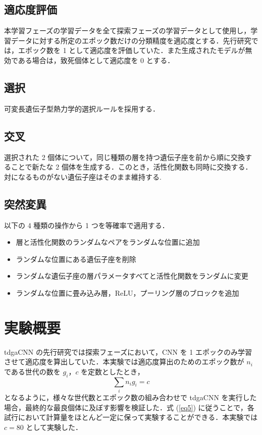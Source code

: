 \documentclass[twocolumn]{jarticle}     %
\begin{document}
\subsection{適応度評価}
本学習フェーズの学習データを全て探索フェーズの学習データとして使用し，学習データに対する所定のエポック数だけの分類精度を適応度とする．先行研究では，エポック数を 1 として適応度を評価していた．また生成されたモデルが無効である場合は，致死個体として適応度を 0 とする．

\subsection{選択}
可変長遺伝子型熱力学的選択ルールを採用する．

\subsection{交叉}
選択された 2 個体について，同じ種類の層を持つ遺伝子座を前から順に交換することで新たな 2 個体を生成する．このとき，活性化関数も同時に交換する．対になるものがない遺伝子座はそのまま維持する.

\subsection{突然変異}
以下の 4 種類の操作から 1 つを等確率で適用する．
\begin{itemize}
    \item 層と活性化関数のランダムなペアをランダムな位置に追加
    \item ランダムな位置にある遺伝子座を削除
    \item ランダムな遺伝子座の層パラメータすべてと活性化関数をランダムに変更
    \item ランダムな位置に畳み込み層，ReLU，プーリング層のブロックを追加
\end{itemize}

\section{実験概要}
tdgaCNN の先行研究では探索フェーズにおいて，CNN を 1 エポックのみ学習させて適応度を算出していた．本実験では適応度算出のためのエポック数が $n_i$ である世代の数を $g_i$，$c$ を定数としたとき，
\begin{equation}
    \sum_i {n_i}{g_i} = c
    \label{eq5}
\end{equation}
となるように，様々な世代数とエポック数の組み合わせで tdgaCNN を実行した場合，最終的な最良個体に及ぼす影響を検証した．式 (\ref{eq5}) に従うことで，各試行において計算量をほとんど一定に保って実験することができる．本実験では $c = 80$ として実験した．\par
\end{document}
